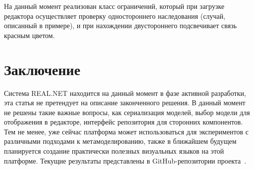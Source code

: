\documentclass{spisok-article}
\begin{document}
На данный момент реализован класс ограничений, который при загрузке редактора осуществляет проверку одностороннего наследования (случай, описанный в примере), и при нахождении двустороннего подсвечивает связь красным цветом.

\section{Заключение}

Система REAL.NET находится на данный момент в фазе активной разработки, эта статья не претендует на описание законченного решения. В данный момент не решены такие важные вопросы, как сериализация моделей, выбор модели для отображения в редакторе, интерфейс репозитория для сторонних компонентов. Тем не менее, уже сейчас платформа может использоваться для экспериментов с различными подходами к  метамоделированию, также в ближайшем будущем планируется создание практически полезных визуальных языков на этой платформе. Текущие результаты представлены в GitHub-репозитории проекта~\cite{realNetGithub}.
\end{document}
